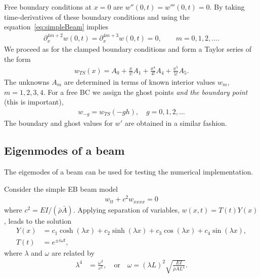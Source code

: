 \documentclass[11pt]{article}
\newcommand{\rhos}{\bar{\rho}}
\newcommand{\As}{\bar{A}}
\begin{document}
Free boundary conditions at $x=0$ are $w''(0,t)=w'''(0,t)=0$.
By taking time-derivatives of these boundary conditions and using the equation~\eqref{eq:simpleBeam}
implies
\begin{align}
     \partial_x^{4m+2}w(0,t) = \partial_x^{4m+3}w(0,t)=0, \qquad m=0,1,2,\ldots.
\end{align}
We proceed as for the clamped boundary conditions and form a Taylor series of
the form
\begin{align}
     w_{TS}(x) =  A_0 + \frac{x}{1!} A_1  + \frac{x^4}{4!} A_4 + \frac{x^5}{5!} A_5 .
\end{align}
The unknowns  $A_m$ are determined in terms of known interior values $w_m$, $m=1,2,3,4$. 
For a free BC we assign the ghost points {\em and the boundary point} (this is important), 
\begin{align}
   w_{-g} =  w_{TS}(-g h) , \quad g=0,1,2,\ldots
\end{align}
The boundary and ghost values for $w'$ are obtained in a similar fashion.


\clearpage
\subsection{Eigenmodes of a beam} \label{eq:BeamModel_Eigenmodes}

The eigemodes of a beam can be used for testing the numerical implementation.

Consider the simple EB beam model 
\begin{align*}
    w_{tt} + c^2 w_{xxxx} = 0
\end{align*}
where $c^2= E I/(\rhos\As)$. 
Applying separation of variables, $w(x,t) = T(t) Y(x)$, leads to the solution
\begin{align*}
    Y(x) &= c_1 \cosh(\lambda x) + c_2\sinh(\lambda x) + c_3 \cos(\lambda x) + c_4 \sin(\lambda x), \\
    T(t) &= e^{\pm i \omega t},
\end{align*}
where $\lambda$ and $\omega$ are related by
\begin{align*}
    \lambda^4 &= \frac{\omega^2}{c^2}, \quad\text{or}\quad \omega = (\lambda L)^2\sqrt{ \frac{E I}{\rhos\As L^4}}. 
\end{align*}
\end{document}
